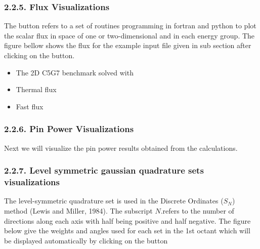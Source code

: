 \documentclass[letterpaper,10pt,english]{sphinxmanual}
\begin{document}
\subsubsection{2.2.5. Flux Visualizations}
\label{\detokenize{Guide:flux-visualizations}}
The  button refers to a set of routines programming in fortran and python to plot the scalar flux in space of one or two-dimensional and in each energy group. The figure bellow shows the flux for the example input file given in sub section  after clicking on the  button.
\begin{itemize}
\item {} 
The 2D C5G7 benchmark solved with 

\end{itemize}
\begin{itemize}
\item {} 
Thermal flux

\end{itemize}

\noindent{}
\begin{itemize}
\item {} 
Fast flux

\end{itemize}

\noindent{}


\subsubsection{2.2.6. Pin Power Visualizations}
\label{\detokenize{Guide:pin-power-visualizations}}
Next we will visualize the pin power results obtained from the   calculations.

\noindent{}


\subsubsection{2.2.7. Level symmetric gaussian quadrature sets visualizations}
\label{\detokenize{Guide:level-symmetric-gaussian-quadrature-sets-visualizations}}
The level-symmetric quadrature set is used in the Discrete Ordinates (\(S_{N}\)) method (Lewis and Miller, 1984). The subscript \(N\).refers to the number of directions along each axis with half being positive and half negative. The figure below give the weights and angles used for each set in the 1st octant which will be displayed automatically by clicking on the  button
\end{document}

